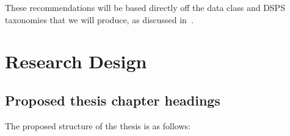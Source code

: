 \documentclass[a4paper,11pt]{article}
\begin{document}
These recommendations will be based directly off the data class and DSPS taxonomies that we will produce, as discussed
in~.




\newpage


\section{Research Design} %
\label{sec:research_design}

\subsection{Proposed thesis chapter headings} %
\label{sub:proposed_thesis_chapter_headings}

The proposed structure of the thesis is as follows:
\end{document}
